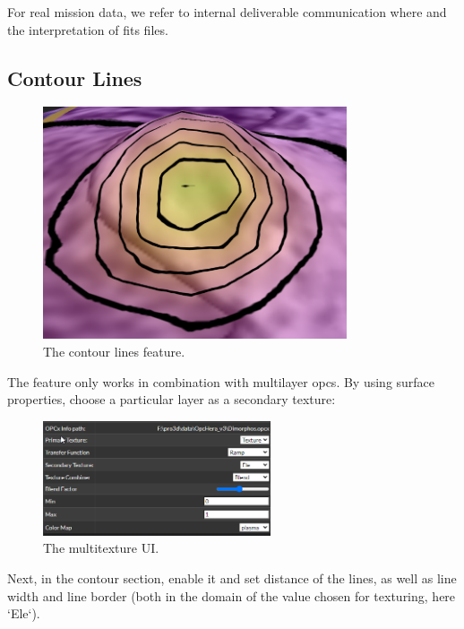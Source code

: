 For real mission data, we refer to internal deliverable communication where and the interpretation of fits files.


\newpage
\subsection{Contour Lines}
\label{sec:contourLines}

\begin{figure}[h!]
	\centering
	\includegraphics[width=0.8\textwidth]{pics/contourTeaser.png}
	\caption{The contour lines feature.}
\end{figure}

The feature only works in combination with multilayer opcs. By using surface properties, choose a particular layer as a secondary texture:

\begin{figure}[h!]
	\centering
	\includegraphics[width=0.6\textwidth]{pics/multitexture-ui.png}
	\caption{The multitexture UI.}
\end{figure}

Next, in the contour section, enable it and set distance of the lines, as well as line width and line border (both in the domain of the value chosen for texturing, here `Ele`).

